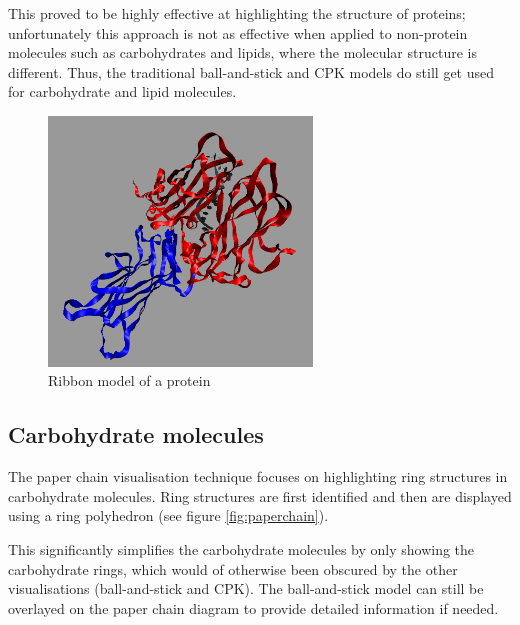 This proved to be highly effective at highlighting the structure of proteins;
unfortunately this approach is not as effective when applied to non-protein
molecules such as carbohydrates and lipids, where the molecular structure is
different. Thus, the traditional ball-and-stick and CPK models do still get
used for carbohydrate and lipid molecules.

\begin{figure}[h!]
  \begin{center}
    \includegraphics[width=70mm]{ribbon}
  \end{center}
  \caption{Ribbon model of a protein}
  \label{fig:ribbon}
\end{figure}


\subsection{Carbohydrate molecules}
\label{sub:carbohydrate}

The paper chain visualisation technique \citep{kuttel06} focuses on highlighting
ring structures in carbohydrate molecules. Ring structures are first identified
and then are displayed using a ring polyhedron (see figure \ref{fig:paperchain}).

This significantly simplifies the carbohydrate molecules by only showing the
carbohydrate rings, which would of otherwise been obscured by the other
visualisations (ball-and-stick and CPK). The ball-and-stick model can still be
overlayed on the paper chain diagram to provide detailed information if needed.

